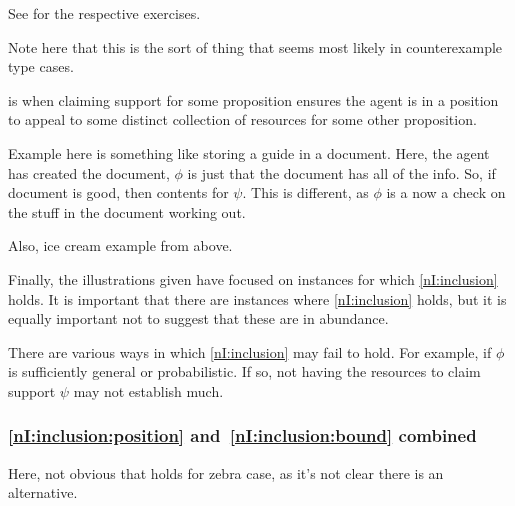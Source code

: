\begin{note}[Inclusion]
{    See \textcite[210]{Blackburn:2002aa} for the respective exercises.
  }

  {
    \color{red}
    Note here that this is the sort of thing that seems most likely in counterexample type cases.
  }
\end{note}

\begin{note}[\asso{}]
  \asso{} is when claiming support for some proposition ensures the agent is in a position to appeal to some distinct collection of resources for some other proposition.

  \begin{illustration}
    Example here is something like storing a guide in a document.
    Here, the agent has created the document, \(\phi\) is just that the document has all of the info.
    So, if document is good, then contents for \(\psi\).
    This is different, as \(\phi\) is a now a check on the stuff in the document working out.
  \end{illustration}

  Also, ice cream example from above.
\end{note}

\begin{note}
  Finally, the illustrations given have focused on instances for which \ref{nI:inclusion} holds.
  It is important that there are instances where \ref{nI:inclusion} holds, but it is equally important not to suggest that these are in abundance.
\end{note}

\begin{note}
  There are various ways in which \ref{nI:inclusion} may fail to hold.
  For example, if \(\phi\) is sufficiently general or probabilistic.
  If so, not having the resources to claim support \(\psi\) may not establish much.
\end{note}

\subsubsection{\ref{nI:inclusion:position} and~\ref{nI:inclusion:bound} combined}

\begin{note}
  Here, not obvious that holds for zebra case, as it's not clear there is an alternative.
\end{note}

